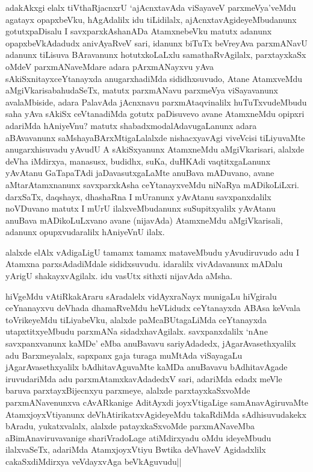 \begin{artha}%
adakAkxgi elalx tiVthaRjacnxrU `ajAcnxtavAda viSayaveV parxmeVya'veMdu agatayx opapxbeVku, hAgAdalilx idu tiLidilalx, ajAcnxtavAgideyeMbudanunx gotutxpaDisalu I savxparxkAshanADa AtamxnebeVku matutx adanunx opapxbeVkAdadudx anivAyaRveV sari, idanunx biTuTx beVreyAva parxmANavU adanunx tiLisuva BAravanunx hotutxkoLaLxlu samathaRvAgilalx, parxtayxkaSx oMdeV parxmANaveMdare adara pArxmANayxvu yAva sAkiSxnitayxceYtanayxda anugarxhadiMda sididhxsuvudo, Atane AtamxveMdu aMgiVkarisabahudaSeTx, matutx parxmANavu parxmeVya viSayavanunx avalaMbiside, adara PalavAda jAcnxnavu parxmAtaqvinalilx huTuTxvudeMbudu saha yAva sAkiSx ceVtanadiMda gotutx paDisuvevo avane AtamxneMdu opipxri adariMda hAniyeVnu? matutx shabadxmodalAdavugaLanunx adara aBAvavanunx saMshayaBArxMtigaLalalxde nishacxyavAgi viveVcisi tiLiyuvaMte anugarxhisuvadu yAvudU A sAkiSxyanunx AtamxneMdu aMgiVkarisari, alalxde deVha iMdirxya, manasusx, budidhx, suKa, duHKAdi vaqtitxgaLanunx yAvAtanu GaTapaTAdi jaDavasutxgaLaMte anuBava mADuvano, avane aMtarAtamxnanunx savxparxkAsha ceYtanayxveMdu niNaRya mADikoLiLxri. darxSaTx, daqshayx, dhashaRna I mUranunx yAvAtanu savxpanxdalilx noVDuvano matutx I mUrU ilalxveMbudanunx suSupitxyalilx yAvAtanu anuBava mADikoLuLxvano avane (nijavAda) AtamxneMdu aMgiVkarisali, adanunx opupxvudaralilx hAniyeVnU ilalx.
\end{artha}

\begin{artha}
alalxde elAlx vAdigaLigU tamamx tamamx mataveMbudu yAvudiruvudo adu I Atamxna parxsAdadiMdale sididxsuvudu. idaralilx vivAdavanunx mADalu yArigU shakayxvAgilalx. idu vasUtx sithxti nijavAda aMsha. 
\end{artha}

\begin{artha}
hiVgeMdu vAtiRkakAraru sAradalelx vidAyxraNayx munigaLu hiVgiralu ceYnanayxvu deVhada dhamaRveMdu heVLidudx ceYtanayxda ABAsa keVvala toVrikeyeMdu tiLiyabeVku, alalxde paMcaBUtagaLiMda ceYtanayxda utapxtitxyeMbudu parxmANa sidadxhavAgilalx. savxpanxdalilx `nAne savxpanxvanunx kaMDe' eMba anuBavavu sariyAdadedx, jAgarAvasethxyalilx adu Barxmeyalalx, sapxpanx gaja turaga muMtAda viSayagaLu jAgarAvasethxyalilx bAdhitavAguvaMte kaMDa anuBavavu bAdhitavAgade iruvudariMda adu parxmAtamxkavAdadedxV sari, adariMda edadx meVle baruva parxtayxBijecnxyu parxmeye, alalxde parxtayxkaSxvoMde parxmANavenunxva cAvARkanige AditAyxdi joyxVtigaLige samAnavAgiruvaMte AtamxjoyxVtiyanunx deVhAtirikatxvAgideyeMdu takaRdiMda sAdhisuvudakekx bAradu, yukatxvalalx, alalxde patayxkaSxvoMde parxmANaveMba aBimAnaviruvavanige shariVradoLage atiMdirxyadu oMdu ideyeMbudu ilalxvaSeTx, adariMda AtamxjoyxVtiyu Bwtika deVhaveV Agidadxlilx cakaSxdiMdirxya veVdayxvAga beVkAguvudu||
\end{artha}%

